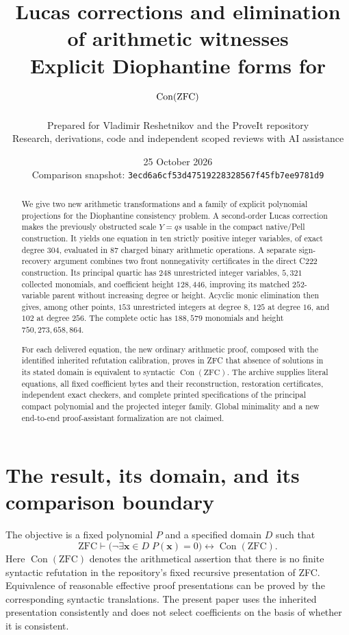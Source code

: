 \documentclass[11pt,letterpaper]{article}
\title{\color{inkblue}\bfseries Lucas corrections and elimination\\
of arithmetic witnesses\vspace{5pt}\\
\large Explicit Diophantine forms for $\Con(\mathrm{ZFC})$}
\author{Prepared for Vladimir Reshetnikov and the ProveIt repository\\
\small Research, derivations, code and independent scoped reviews with AI assistance}
\date{25 October 2026\\\small Comparison snapshot:
\texttt{3ecd6a6cf53d47519228328567f45fb7ee9781d9}}
\newcommand{\Con}{\operatorname{Con}}
\theoremstyle{definition}
\theoremstyle{remark}
\begin{document}
\maketitle

\begin{abstract}
We give two new arithmetic transformations and a family of explicit polynomial
projections for the Diophantine consistency problem.  A second-order Lucas
correction makes the previously obstructed scale $Y=qs$ usable in the compact
native/Pell construction.  It yields one equation in ten strictly positive
integer variables, of exact degree $304$, evaluated in $87$ charged binary
arithmetic operations.  A separate sign-recovery argument combines two front
nonnegativity certificates in the direct C222 construction.  Its principal
quartic has $248$ unrestricted integer variables, $5{,}321$ collected monomials,
and coefficient height $128{,}446$, improving its matched $252$-variable parent
without increasing degree or height.  Acyclic monic elimination then gives,
among other points, $153$ unrestricted integers at degree $8$, $125$ at degree
$16$, and $102$ at degree $256$.  The complete octic has $188{,}579$ monomials
and height $750{,}273{,}658{,}864$.

For each delivered equation, the new ordinary arithmetic proof, composed with
the identified inherited refutation calibration, proves in ZFC that absence
of solutions in its stated domain is equivalent to syntactic
$\Con(\mathrm{ZFC})$.  The archive supplies literal equations, all fixed
coefficient bytes and their reconstruction, restoration certificates,
independent exact checkers, and complete printed specifications of the
principal compact polynomial and the projected integer family.  Global
minimality and a new end-to-end proof-assistant formalization are not claimed.
\end{abstract}

\tableofcontents
\clearpage

\section{The result, its domain, and its comparison boundary}
\label{sec:overview}

The objective is a fixed polynomial $P$ and a specified domain $D$ such that
\begin{equation}
 \mathrm{ZFC}\vdash
 \bigl(\neg\exists\mathbf x\in D\;P(\mathbf x)=0\bigr)
 \longleftrightarrow\Con(\mathrm{ZFC}).
 \label{eq:target}
\end{equation}
Here $\Con(\mathrm{ZFC})$ denotes the arithmetical assertion that there is no
finite syntactic refutation in the repository's fixed recursive presentation
of ZFC.  Equivalence of reasonable effective proof presentations can be
proved by the corresponding syntactic translations.  The present paper uses
the inherited presentation consistently and does not select coefficients on
the basis of whether it is consistent.
\end{document}
